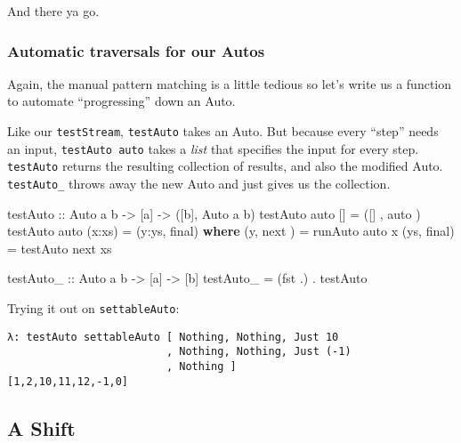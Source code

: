 \documentclass[]{article}
\newenvironment{Shaded}{}{}
\newcommand{\KeywordTok}[1]{\textcolor[rgb]{0.00,0.44,0.13}{\textbf{{#1}}}}
\newcommand{\DataTypeTok}[1]{\textcolor[rgb]{0.56,0.13,0.00}{{#1}}}
\newcommand{\OtherTok}[1]{\textcolor[rgb]{0.00,0.44,0.13}{{#1}}}
\newcommand{\FunctionTok}[1]{\textcolor[rgb]{0.02,0.16,0.49}{{#1}}}
\newcommand{\NormalTok}[1]{{#1}}
\begin{document}
And there ya go.

\subsubsection{Automatic traversals for our Autos}\label{automatic-traversals-for-our-autos}

Again, the manual pattern matching is a little tedious so let's write us a function to automate
``progressing'' down an Auto.

Like our \texttt{testStream}, \texttt{testAuto} takes an Auto. But because every ``step'' needs an
input, \texttt{testAuto\ auto} takes a \emph{list} that specifies the input for every step.
\texttt{testAuto} returns the resulting collection of results, and also the modified Auto.
\texttt{testAuto\_} throws away the new Auto and just gives us the collection.

\begin{Shaded}
\begin{Highlighting}[]
\OtherTok{testAuto ::} \DataTypeTok{Auto} \NormalTok{a b }\OtherTok{->} \NormalTok{[a] }\OtherTok{->} \NormalTok{([b], }\DataTypeTok{Auto} \NormalTok{a b)}
\NormalTok{testAuto auto []      }\FunctionTok{=} \NormalTok{([]  , auto )}
\NormalTok{testAuto auto (x}\FunctionTok{:}\NormalTok{xs)  }\FunctionTok{=} \NormalTok{(y}\FunctionTok{:}\NormalTok{ys, final)}
  \KeywordTok{where}
    \NormalTok{(y,  next ) }\FunctionTok{=} \NormalTok{runAuto  auto x}
    \NormalTok{(ys, final) }\FunctionTok{=} \NormalTok{testAuto next xs}

\OtherTok{testAuto_ ::} \DataTypeTok{Auto} \NormalTok{a b }\OtherTok{->} \NormalTok{[a] }\OtherTok{->} \NormalTok{[b]}
\NormalTok{testAuto_ }\FunctionTok{=} \NormalTok{(fst }\FunctionTok{.}\NormalTok{) }\FunctionTok{.} \NormalTok{testAuto}
\end{Highlighting}
\end{Shaded}

Trying it out on \texttt{settableAuto}:

\begin{verbatim}
λ: testAuto settableAuto [ Nothing, Nothing, Just 10
                         , Nothing, Nothing, Just (-1)
                         , Nothing ]
[1,2,10,11,12,-1,0]
\end{verbatim}

\subsection{A Shift}\label{a-shift}
\end{document}
